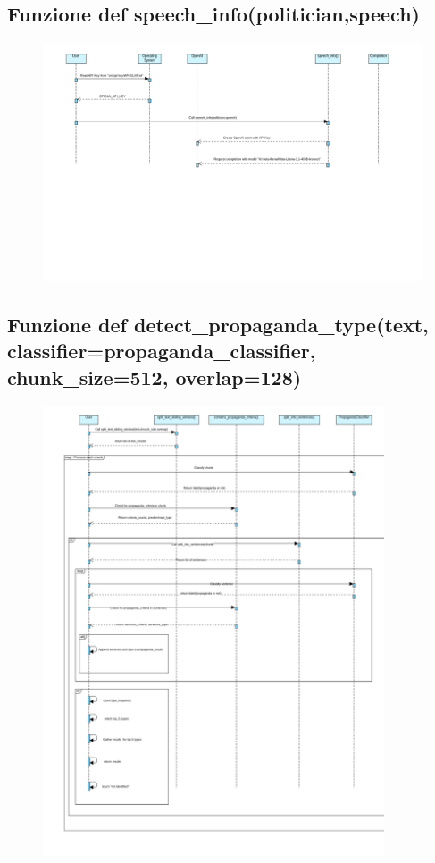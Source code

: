 \documentclass{article}
\begin{document}
	\subsection{Funzione def speech\_info(politician,speech)}
	\begin{figure}[h]
		\centering
		\includegraphics[width=1.1\textwidth]{immagini/speechscraping}
	\end{figure}
	\subsection{Funzione def detect\_propaganda\_type(text, classifier=propaganda\_classifier, chunk\_size=512, overlap=128)}
	\begin{figure}[H]
		\centering
		\includegraphics[width=0.9\textwidth]{immagini/propagandatype}
	\end{figure}
\end{document}

